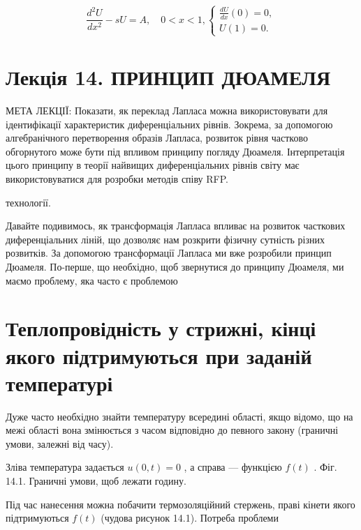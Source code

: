 \documentclass[
  ukrainian,
]{article}
\begin{document}
\[
\frac{d^2U}{dx^2} - sU = A, \quad 0 < x < 1,
\begin{cases}
\frac{dU}{dx}(0) = 0, \\
U(1) = 0.
\end{cases}
\]

\section{Лекція 14. ПРИНЦИП
ДЮАМЕЛЯ}\label{ux43bux435ux43aux446ux456ux44f-14.-ux43fux440ux438ux43dux446ux438ux43f-ux434ux44eux430ux43cux435ux43bux44f}

МЕТА ЛЕКЦІЇ: Показати, як переклад Лапласа можна використовувати для
ідентифікації характеристик диференціальних рівнів. Зокрема, за
допомогою алгебранічного перетворення образів Лапласа, розвиток рівня
частково обгорнутого може бути під впливом принципу погляду Дюамеля.
Інтерпретація цього принципу в теорії найвищих диференціальних рівнів
світу має використовуватися для розробки методів співу RFP.

технології.

Давайте подивимось, як трансформація Лапласа впливає на розвиток
часткових диференціальних ліній, що дозволяє нам розкрити фізичну
сутність різних розвитків. За допомогою трансформації Лапласа ми вже
розробили принцип Дюамеля. По-перше, що необхідно, щоб звернутися до
принципу Дюамеля, ми маємо проблему, яка часто є проблемою

\section{Теплопровідність у стрижні, кінці якого підтримуються при
заданій
температурі}\label{ux442ux435ux43fux43bux43eux43fux440ux43eux432ux456ux434ux43dux456ux441ux442ux44c-ux443-ux441ux442ux440ux438ux436ux43dux456-ux43aux456ux43dux446ux456-ux44fux43aux43eux433ux43e-ux43fux456ux434ux442ux440ux438ux43cux443ux44eux442ux44cux441ux44f-ux43fux440ux438-ux437ux430ux434ux430ux43dux456ux439-ux442ux435ux43cux43fux435ux440ux430ux442ux443ux440ux456}

Дуже часто необхідно знайти температуру всередині області, якщо відомо,
що на межі області вона змінюється з часом відповідно до певного закону
(граничні умови, залежні від часу).

Зліва температура задається \(u(0,t)=0\) , а справа --- функцією
\(f(t)\) . Фіг. 14.1. Граничні умови, щоб лежати годину.

Під час нанесення можна побачити термозоляційний стержень, праві кінети
якого підтримуються \(f(t)\) (чудова рисунок 14.1). Потреба проблеми
\end{document}
